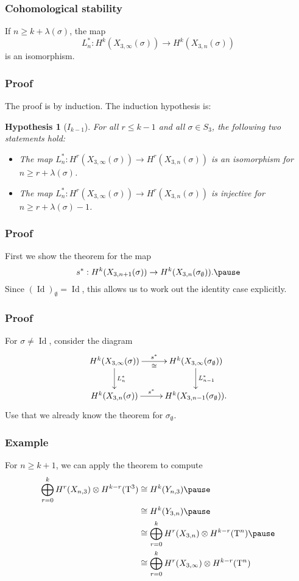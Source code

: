\documentclass{beamer} %
\newtheorem*{hypothesis}{Hypothesis}
\DeclareMathOperator{\Id}{Id}
\newcommand{\T}{\mathrm{T}}
\begin{document}
\begin{frame}
  \frametitle{Cohomological stability}
  \begin{theorem}
    If $n \geq k + \lambda(\sigma)$, the map
    \[ L_n^* : H^k(X_{3,\infty}(\sigma)) \to H^k(X_{3,n}(\sigma)) \]
    is an isomorphism.
  \end{theorem}
\end{frame}

\begin{frame}
  \frametitle{Proof}
  The proof is by induction. The induction hypothesis is:
  \begin{hypothesis}[$I_{k-1}$]
    For all $r \leq k-1$ and all $\sigma \in S_3$, the following two
    statements hold:
    \begin{itemize}
    \item The map $L_{n}^* : H^r(X_{3,\infty}(\sigma)) \to
      H^r(X_{3,n}(\sigma))$ is an isomorphism for $n \geq r +
      \lambda(\sigma)$.
    \item The map $L_{n}^* : H^r(X_{3,\infty}(\sigma)) \to
      H^r(X_{3,n}(\sigma))$ is injective for $n \geq r +\lambda(\sigma)
      -1$.
    \end{itemize}
  \end{hypothesis}
\end{frame}

\begin{frame}
  \frametitle{Proof}
  First we show the theorem for the map
  \[ s^* : H^k(X_{3,n+1}(\sigma)) \to
  H^k(X_{3,n}(\sigma_{\emptyset})). \pause \]
  Since $(\Id)_{\emptyset} = \Id$, this allows us to work out the
  identity case explicitly.
\end{frame}

\begin{frame}
  \frametitle{Proof}
  For $\sigma\neq\Id$, consider the diagram
  \[ \xymatrix{
    H^k(X_{3,\infty}(\sigma)) \ar[r]^-{s^*}_-{\cong} \ar[d]^{L_n^*} &
    H^k(X_{3,\infty}(\sigma_{\emptyset})) \ar[d]^{L_{n-1}^*} \\
    H^k(X_{3,n}(\sigma)) \ar[r]^-{s^*} & H^k(X_{3,n-1}(\sigma_{\emptyset})).
  } \]
  Use that we already know the theorem for $\sigma_{\emptyset}$.
\end{frame}

\begin{frame}
  \frametitle{Example}
  \begin{example}
    For $n\geq k+1$, we can apply the theorem to compute
    \begin{align*}
      \bigoplus_{r=0}^k H^r(X_{n,3}) \otimes H^{k-r}(\T^3)
      &\cong H^k(Y_{n,3}) \pause \\
      &\cong H^k(Y_{3,n}) \pause \\
      &\cong \bigoplus_{r=0}^k H^r(X_{3,n}) \otimes H^{k-r}(\T^n)
        \pause \\
      &\cong \bigoplus_{r=0}^k H^r(X_{3,\infty}) \otimes H^{k-r}(\T^n)
    \end{align*}
  \end{example}
\end{frame}
\end{document}
